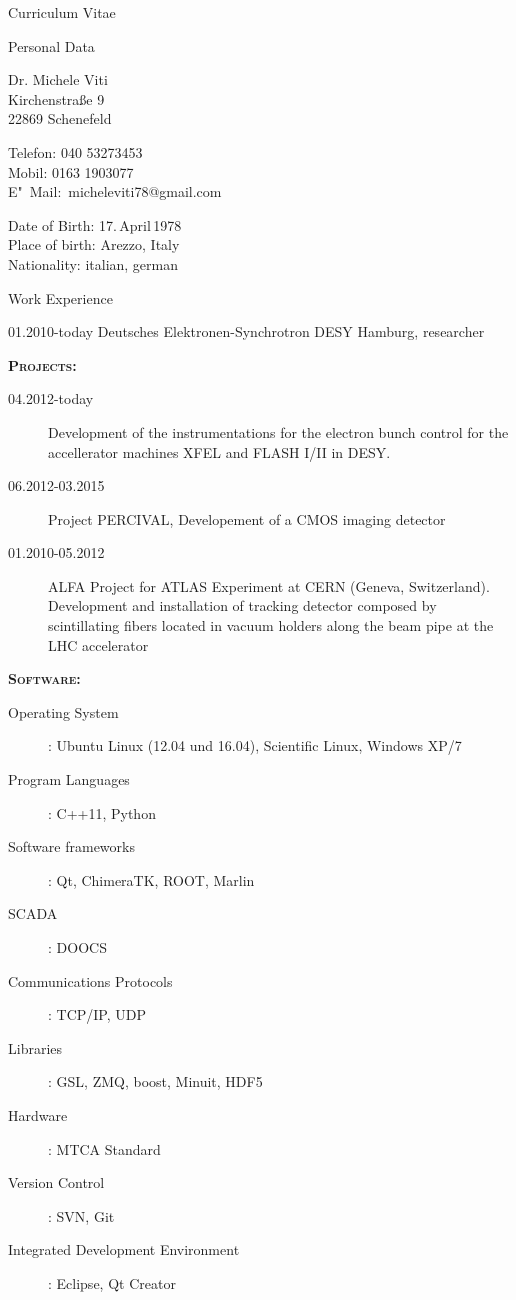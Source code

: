 \documentclass[11pt,a4paper]{scrartcl}
\begin{document}
\begin{cv}{Curriculum Vitae}
\begin{cvlist}{Personal Data}
\item Dr. Michele Viti\\
Kirchenstra{\ss}e 9\\
22869 Schenefeld
\item Telefon: 040 53273453\\
Mobil: 0163 1903077\\
E"~Mail:~micheleviti78@gmail.com
\item Date of Birth: 17.\,April\,1978\\
Place of birth: Arezzo, Italy\\
Nationality: italian, german
\end{cvlist}

\begin{cvlist}{Work Experience}

\item[01.2010-today] Deutsches Elektronen-Synchrotron DESY Hamburg, researcher

{\scshape {\bfseries Projects:}}
\begin{description}
\item[04.2012-today] Development of the instrumentations for the electron bunch
control for the accellerator machines XFEL and FLASH I/II in DESY.
\item[06.2012-03.2015]Project PERCIVAL, Developement of a CMOS imaging
detector
\item[01.2010-05.2012]ALFA Project for ATLAS Experiment at CERN (Geneva,
Switzerland). Development and installation of tracking detector composed by
scintillating fibers  located in vacuum holders along the beam pipe at the LHC
accelerator
\end{description}
{\scshape {\bfseries Software:}}
\begin{description}
\item[Operating System] : Ubuntu Linux (12.04 und 16.04), Scientific Linux,
Windows XP/7
\item[Program Languages] : C++11, Python
\item[Software frameworks] : Qt, ChimeraTK, ROOT, Marlin
\item[SCADA] : DOOCS
\item[Communications Protocols] : TCP/IP, UDP
\item[Libraries] : GSL, ZMQ, boost, Minuit, HDF5
\item[Hardware] : MTCA Standard
\item[Version Control] : SVN, Git
\item[Integrated Development Environment] : Eclipse, Qt Creator
\end{description}


\end{cvlist}
\end{cv}
\end{document}
